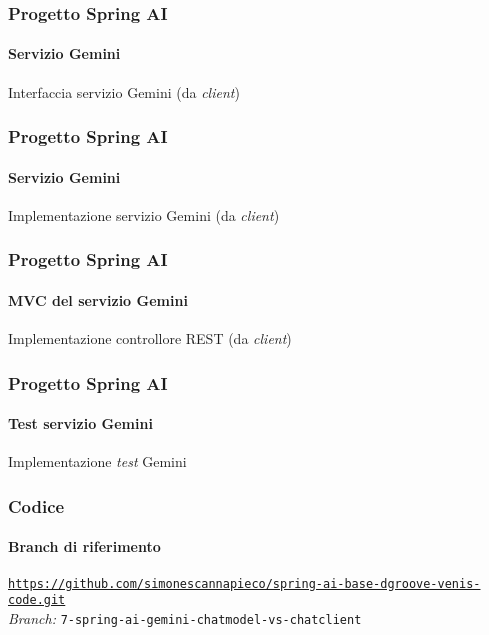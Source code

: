 %
\begin{frame}[t,fragile] \frametitle{Progetto Spring AI}
    \framesubtitle{Servizio Gemini}
        \begin{block}{Interfaccia servizio Gemini (da \textit{client})}
{\tiny}
    \end{block}
\end{frame}
%
\begin{frame}[t,fragile] \frametitle{Progetto Spring AI}
    \framesubtitle{Servizio Gemini}
		\vspace*{-.7cm}
        \begin{block}{Implementazione servizio Gemini (da \textit{client})}
{\tiny}
    \end{block}
\end{frame}
%
\begin{frame}[t,fragile] \frametitle{Progetto Spring AI}
    \framesubtitle{MVC del servizio Gemini}
    	\vspace*{-.7cm}
        \begin{block}{Implementazione controllore REST (da \textit{client})}
			{\tiny}
    	\end{block}
\end{frame}
%
\begin{frame}[t,fragile] \frametitle{Progetto Spring AI}
    \framesubtitle{Test servizio Gemini}
        \begin{block}{Implementazione \textit{test} Gemini}
{\tiny}
    \end{block}
\end{frame}
%
\begin{frame}[fragile] \frametitle{Codice}
    \framesubtitle{Branch di riferimento}
	\begin{center}
		{\scriptsize \href{https://github.com/simonescannapieco/spring-ai-base-dgroove-venis-code.git}{\texttt{https://github.com/simonescannapieco/spring-ai-base-dgroove-venis-code.git}}}\\
		\textit{Branch:} \alert{\texttt{7-spring-ai-gemini-chatmodel-vs-chatclient}}
	\end{center}
\end{frame}